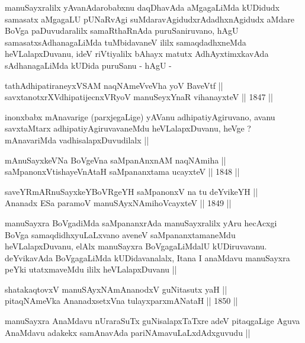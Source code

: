 \begin{artha}
manuSayxralilx yAvanAdarobabxnu daqDhavAda aMgagaLiMda kUDidudx
samasatx aMgagaLU pUNaRvAgi suMdaravAgidudxrAdadhxnAgidudx aMdare
BoVga paDuvudaralilx samaRthaRnAda puruSaniruvano, hAgU
samasatxsAdhanagaLiMda tuMbidavaneV ililx samaqdadhxneMda
heVLalapxDuvanu, ideV riVtiyalilx bAhayx matutx AdhAyxtimxkavAda
sAdhanagaLiMda kUDida puruSanu - hAgU -
\end{artha}

\begin{shl}
tathA\s dhipatiraneyxVSAM naqNAmeVveVha yoV BaveVtf || \\
savxtanotxrXV\s dhipatijecnxVRyoV manuSeyxYnaR vihanayxteV ||  1847 ||  
\end{shl}

\begin{artha}
inonxbabx mAnavarige (parxjegaLige) yAVanu adhipatiyAgiruvano, avanu
savxtaMtarx adhipatiyAgiruvavaneMdu heVLalapxDuvanu, heVge ?
mAnavariMda vadhisalapxDuvudilalx ||
\end{artha}


\begin{shl}
mAnuSayxkeVNa BoVgeVna saMpanAnxnAM naqNAmiha || \\
saMpanonxV\s tishayeVnAtaH saMpananxtama ucayxteV ||  1848 ||  
\end{shl}

\begin{shl}
saveYRmARnuSayxkeYBoVRgeYH saMpanonxV na tu deYvikeYH || \\
Ananadx ESa paramoV manuSAyxNAmihoVcayxteV ||  1849 ||  
\end{shl}

\begin{artha}
manuSayxra BoVgadiMda saMpananxrAda manuSayxralilx yAru hecAcxgi BoVga
samaqdidhxyuLaLxvano aveneV saMpananxtamaneMdu heVLalapxDuvanu, elAlx
manuSayxra BoVgagaLiMdalU kUDiruvavanu. deYvikavAda BoVgagaLiMda
kUDidavanalalx, Itana I anaMdavu manuSayxra peYki utatxmaveMdu ililx
heVLalapxDuvanu ||
\end{artha}

\begin{shl}
shatakaqtovxV manuSAyxNAmAnanodxV guNitasutx yaH || \\
pitaqNAmeVka AnanadxsetxVna tulayxparxmANataH ||  1850 ||  
\end{shl}

\begin{artha}
manuSayxra AnaMdavu nUraraSuTx guNisalapxTaTxre adeV pitaqgaLige Aguva
AnaMdavu adakekx samAnavAda pariNAmavuLaLxdAdxguvudu ||
\end{artha}

